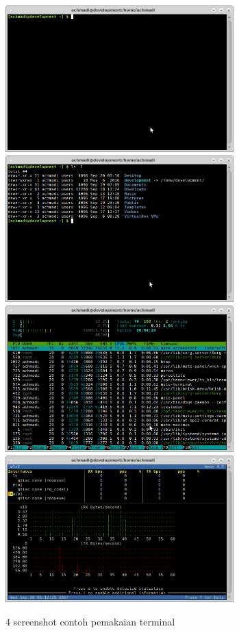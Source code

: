 \documentclass[12pt,]{article}
\begin{document}
	\begin{figure}[!ht]
		\centering
		\includegraphics[width=250pt]{png/term_1}
		\includegraphics[width=250pt]{png/term_2}
		\includegraphics[width=250pt]{png/term_3}
		\includegraphics[width=250pt]{png/term_4}
		\caption{4 screenshot contoh pemakaian terminal}
	\end{figure}
	  
\end{document}

